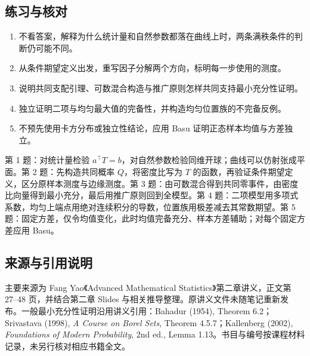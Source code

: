\subsection*{练习与核对}
\begin{enumerate}
\item 不看答案，解释为什么统计量和自然参数都落在曲线上时，两条满秩条件的判断仍可能不同。
\item 从条件期望定义出发，重写因子分解两个方向，标明每一步使用的测度。
\item 说明共同支配引理、可数混合构造与推广原则怎样共同支持最小充分性证明。
\item 独立证明二项与均匀最大值的完备性，并构造均匀位置族的不完备反例。
\item 不预先使用卡方分布或独立性结论，应用 Basu 证明正态样本均值与方差独立。
\end{enumerate}

\begin{notebox}[复习题答案线索]
第 1 题：对统计量检验 $a^\top T=b$，对自然参数检验同维开球；曲线可以仿射张成平面。第 2 题：先构造共同概率 $Q$，将密度比写为 $T$ 的函数，再验证条件期望定义，区分原样本测度与边缘测度。第 3 题：由可数混合得到共同零事件，由密度比向量得到最小充分，最后用推广原则回到全模型。第 4 题：二项模型用多项式系数，均匀上端点用绝对连续积分的导数，位置族用极差减去其常数期望。第 5 题：固定方差，仅令均值变化，此时均值完备充分、样本方差辅助；对每个固定方差应用 Basu。
\end{notebox}

\subsection*{来源与引用说明}
主要来源为 Fang Yao《Advanced Mathematical Statistics》第二章讲义，正文第 27--48 页，并结合第二章 Slides 与相关推导整理。原讲义文件未随笔记重新发布。一般最小充分性证明沿用讲义引用：Bahadur (1954), Theorem 6.2；Srivastava (1998), \emph{A Course on Borel Sets}, Theorem 4.5.7；Kallenberg (2002), \emph{Foundations of Modern Probability}, 2nd ed., Lemma 1.13。书目与编号按课程材料记录，未另行核对相应书籍全文。
